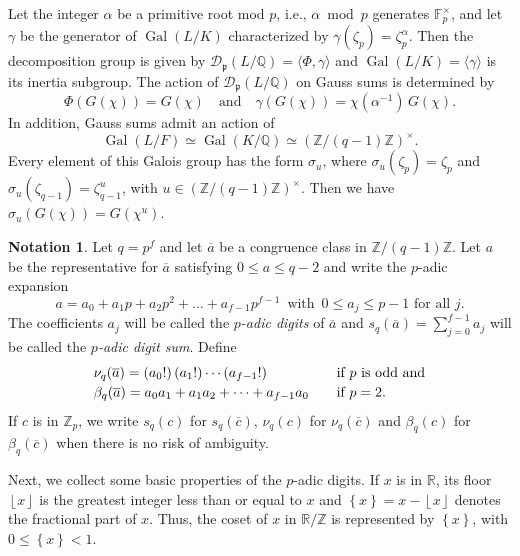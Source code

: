 \documentclass[12pt]{amsart}  \usepackage{amsmath,amssymb,enumerate,amscd,tikz,url}
\numberwithin{equation}{section}
\theoremstyle{definition}
\newtheorem{Not}[equation]{Notation}
\newcommand{\F}{{\mathbb F}}
\newcommand{\Q}{{\mathbb Q}}
\newcommand{\R}{{\mathbb R}}
\newcommand{\Z}{{\mathbb Z}}
\newcommand{\gp}{{\mathfrak p}}
\newcommand{\cD}{{\mathcal D}}
\newcommand{\Gal}{\operatorname{Gal}}
\newcommand{\lr}[1]{{\langle {#1} \rangle}}
\newcommand{\fpart}[1]{{\left\{ {#1}  \right\}}}
\newcommand{\ov}[1]{\overline{#1}}
\newcommand{\floor}[1]{ {\left\lfloor {#1} \right\rfloor} }
\begin{document}
Let the integer $\alpha$ be a primitive root mod $p$, i.e., $\alpha \bmod{p}$ generates $\F_p^\times$, and let $\gamma$ be the generator of $\Gal(L/K)$ characterized by $\gamma(\zeta_p) = \zeta_p^\alpha$.   Then the decomposition group is given by $\cD_\gp(L/\Q) = \lr{\Phi,\gamma}$ and $\Gal(L/K) = \lr{\gamma}$ is its inertia subgroup.  The action of $\cD_\gp(L/\Q)$ on Gauss sums is determined by 
\begin{equation}  \label{DpOnGaussSum}
\Phi(G(\chi)) = G(\chi) \quad \text{and} \quad \gamma(G(\chi)) =  \chi(\alpha^{-1}) \, G(\chi).
\end{equation}
In addition, Gauss sums admit an action of 
$$
\Gal(L/F) \simeq \Gal(K/\Q) \simeq (\Z/(q-1)\Z)^\times.
$$
Every element of this Galois group has the form $\sigma_u$, where $\sigma_u(\zeta_p) = \zeta_p$ and $\sigma_u(\zeta_{q-1}) = \zeta_{q-1}^u$, with $u \in (\Z/(q-1)\Z)^\times$.  Then we have $\sigma_u(G(\chi)) = G(\chi^u)$.


\begin{Not} \label{DigitSum}
Let $q = p^f$ and let $\ov{a}$ be a congruence class in $\Z/(q-1)\Z$.  Let $a$ be the representative for $\ov{a}$ satisfying $0 \le a \le q-2$ and write the $p$-adic expansion
\begin{equation} \label{pAdicDigits}
a = a_0 + a_1p + a_2 p^2 + \dots + a_{f-1}p^{f-1}  \,\text{ with } \, 0 \le a_j \le p-1 \text{ for all } j.
\end{equation}
The coefficients $a_j$ will be called the {\em $p$-adic digits} of $\ov{a}$ and $s_q(\ov{a}) = \sum_{j=0}^{f-1} a_j$ will be called the {\em $p$-adic digit sum}.  Define 
\begin{equation} \label{NuDef}
\begin{array}{l l l}
\nu_q(\ov{a}) = (a_0!) \, (a_1!) \cdots (a_{f-1}!) &\quad \text{if } p \text{ is odd and}  \vspace{2 pt}\\
\beta_q(\ov{a}) =  a_0 a_1 + a_1 a_2 + \dots + a_{f-1} a_0 &\quad \text{if } p=2.
\end{array}
\end{equation}
 If $c$ is in $\Z_p$, we write $s_q(c)$ for $s_q(\ov{c})$, $\nu_q(c)$ for $\nu_q(\ov{c})$ and $\beta_q(c)$ for $\beta_q(\ov{c})$ when there is no risk of ambiguity. 
\end{Not}

\vspace{5 pt}

Next, we collect some basic properties of the $p$-adic digits.  If $x$ is in $\R$, its floor $\floor{x}$ is the greatest integer less than or equal to $x$ and $\fpart{x} = x-\floor{x}$ denotes the fractional part of $x$.  Thus, the coset of $x$ in $\R/\Z$ is represented by $\fpart{x}$, with $0 \le \fpart{x} < 1$. 
\end{document}
